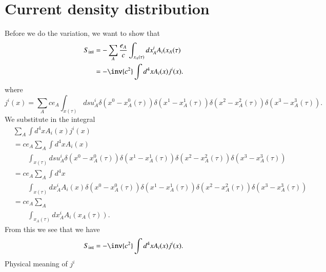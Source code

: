 \section{Current density distribution}

Before we do the variation, we want to show that
%
\begin{equation}\label{eqn:relativisticElectrodynamicsL12b:590}
\begin{aligned}
S_{\text{int}}
&= -\sum_A \frac{e_A}{c} \int_{x_A(\tau)} dx^i_A A_i(x_A(\tau) \\
&= -\inv{c^2} \int d^4 x A_i(x) j^i(x).
\end{aligned}
\end{equation}
%
where
%
\begin{equation}\label{eqn:relativisticElectrodynamicsL12b:390}
j^i(x) =
\sum_A c e_A \int_{x(\tau)}
ds u^i_A
\delta(x^0 - x^0_A(\tau))
\delta(x^1 - x^1_A(\tau))
\delta(x^2 - x^2_A(\tau))
\delta(x^3 - x^3_A(\tau)).
\end{equation}
%
We substitute in the integral
%
\begin{equation}\label{eqn:relativisticElectrodynamicsL12b:610}
\begin{aligned}
&\sum_A \int d^4 x A_i(x) j^i(x) \\
&=
c e_A \sum_A \int d^4 x A_i(x) \\
&\qquad \int_{x(\tau)}
ds u^i_A
\delta(x^0 - x^0_A(\tau))
\delta(x^1 - x^1_A(\tau))
\delta(x^2 - x^2_A(\tau))
\delta(x^3 - x^3_A(\tau)) \\
&=
c e_A \sum_A
\int d^4 x \\
&\qquad \int_{x(\tau)}
dx^i_A
A_i(x)
\delta(x^0 - x^0_A(\tau))
\delta(x^1 - x^1_A(\tau))
\delta(x^2 - x^2_A(\tau))
\delta(x^3 - x^3_A(\tau)) \\
&=
c e_A \sum_A \\
&\qquad \int_{x_A(\tau)}
dx^i_A
A_i(x_A(\tau)).
\end{aligned}
\end{equation}
%
From this we see that we have
%
\begin{equation}\label{eqn:relativisticElectrodynamicsL12b:430}
S_{\text{int}} = -\inv{c^2} \int d^4 x A_i(x) j^i(x).
\end{equation}
%
Physical meaning of \(j^i\)

